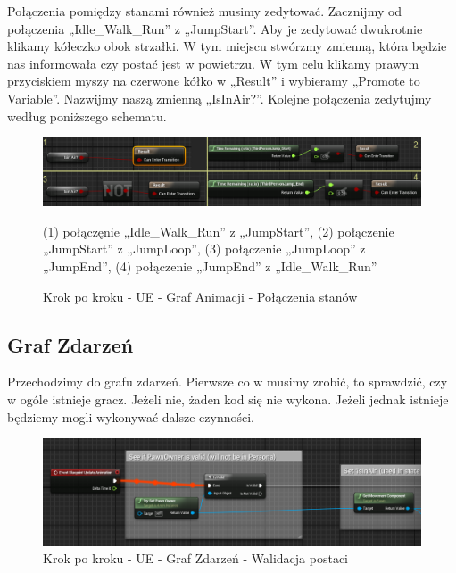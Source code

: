 \documentclass[12pt]{xmgr}
\begin{document}
Połączenia pomiędzy stanami również musimy zedytować. Zacznijmy od połączenia „Idle\_Walk\_Run” z „JumpStart”. Aby je zedytować dwukrotnie klikamy kółeczko obok strzałki. W tym miejscu stwórzmy zmienną, która będzie nas informowała czy postać jest w powietrzu. W tym celu klikamy prawym przyciskiem myszy na czerwone kółko w „Result” i wybieramy „Promote to Variable”. Nazwijmy naszą zmienną „IsInAir?”. Kolejne połączenia zedytujmy według poniższego schematu.
\newpage
\begin{figure}[!htb]
    \begin{center}
    \includegraphics[scale=0.5]{Screeny/UeKrokPoKroku/UE-AnimGraph-Connect.png}
    \end{center}
    \caption{Krok po kroku - UE -  Graf Animacji - Połączenia stanów}
 (1) połączęnie „Idle\_Walk\_Run” z „JumpStart”, (2) połączenie „JumpStart” z „JumpLoop”, (3) połączenie „JumpLoop” z „JumpEnd”, (4) połączenie „JumpEnd” z „Idle\_Walk\_Run”
\end{figure}

\newpage
\subsection{Graf Zdarzeń}
Przechodzimy do grafu zdarzeń. Pierwsze co w musimy zrobić, to sprawdzić, czy w ogóle istnieje gracz. Jeżeli nie, żaden kod się nie wykona. Jeżeli jednak istnieje będziemy mogli wykonywać dalsze czynności.

\begin{figure}[!htb]
    \begin{center}
    \includegraphics[scale=0.6]{Screeny/UeKrokPoKroku/UE-EventGraph-IsValid.png}
    \end{center}
    \caption{Krok po kroku - UE -  Graf Zdarzeń - Walidacja postaci}
\end{figure}
\end{document}
